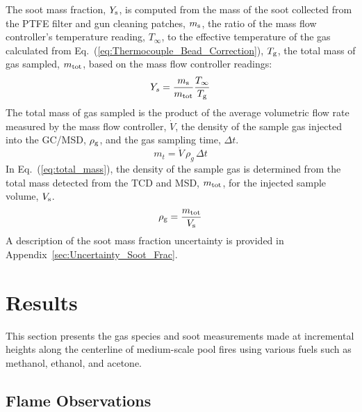 \documentclass[12pt]{article}
\begin{document}
The soot mass fraction, $Y_{\rm s}$, is computed from the mass of the soot collected from the PTFE filter and gun cleaning patches, $m_{\rm s}$, the ratio of the mass flow controller's temperature reading, $T_{\infty}$, to the effective temperature of the gas calculated from Eq.~(\ref{eq:Thermocouple_Bead_Correction}), $T_{\rm g}$, the total mass of gas sampled, $m_{\rm tot}$, based on the mass flow controller readings:
\begin{equation}\label{eq:soot_mass_frac}
Y_{s}= \frac{m_{\rm s}}{m_{\rm tot}}\frac{T_{\infty}}{T_{\rm g}}
\end{equation}
The total mass of gas sampled is the product of the average volumetric flow rate measured by the mass flow controller, $\dot{V}$, the density of the sample gas injected into the GC/MSD, $\rho_{\rm g}$, and the gas sampling time, $\Delta t$.
\begin{equation}\label{eq:total_mass}
m_{t}= \dot{V} \, \rho_{g}\, \Delta t
\end{equation}
In Eq.~(\ref{eq:total_mass}), the density of the sample gas is determined from the total mass detected from the TCD and MSD, $m_{\rm tot}$, for the injected sample volume, $V_{\rm s}$.
\begin{equation}\label{eq:gas_density}
\rho_{\rm g}= \frac{m_{\rm tot}}{V_{\rm s}}
\end{equation}
A description of the soot mass fraction uncertainty is provided in Appendix~\ref{sec:Uncertainty_Soot_Frac}.




\clearpage

\section{Results}
\label{sec:Results}

This section presents the gas species and soot measurements made at incremental heights along the centerline of medium-scale pool fires using various fuels such as methanol, ethanol, and acetone.

\subsection{Flame Observations}
\label{ssec:Flame_Observations}
\end{document}
